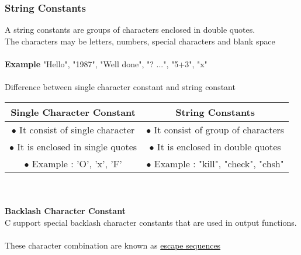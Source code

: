 \documentclass{article}
\begin{document}
	\subsubsection{String Constants}
	A string constants are groups of characters enclosed in double quotes. \\
	The characters may be letters, numbers, special characters and blank space
	\\ \\
	\textbf{Example}
	"Hello", "1987", "Well done", "? ...", "5+3", "x"
	\\ \\
	Difference between single character constant and string constant \\
	\begin{tabular}{|c|c|}
		\hline
		Single Character Constant & String Constants \\
		\hline
		$\bullet$ It consist of single character \hspace{1cm} & $ \bullet$ It consist of group of characters \\
		
		$\bullet$ It is enclosed in single quotes \hspace{0.85cm} & $\bullet$ It is enclosed in double quotes \hspace{0.145cm} \\

		$\bullet$ Example : 'O', 'x', 'F' \hspace{1.945cm} & \hspace{0.095cm} $\bullet$ Example : "kill", "check", "chsh" \\
		\hline
	\end{tabular}
	\\ \\
	\textbf{Backlash Character Constant} \\
	C support special backlash character constants that are used in output functions.
	\\ \\
	These character combination are known as \underline{escape sequences}
	\\ \\
\end{document}
